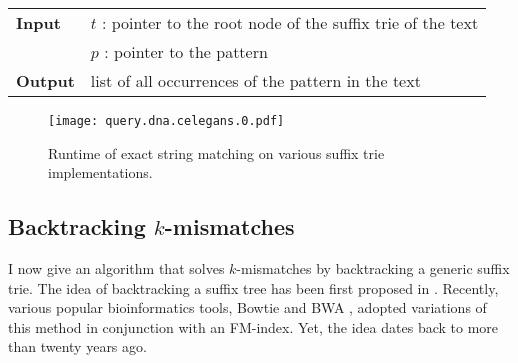 \begin{figure*}[b]
\begin{center}
\begin{minipage}[t]{.8\textwidth}
\begin{algorithm}[H]
\begin{tabular}{ll}
\textbf{Input}  & $t$ : pointer to the root node of the suffix trie of the text\\
				& $p$ : pointer to the pattern\\
\textbf{Output} & list of all occurrences of the pattern in the text\\
\end{tabular}
\begin{algorithmic}[1]
	\State \Report {}
		\State {}
\EndIf
\end{algorithmic}
\label{alg:st-exact}
\end{algorithm}
\end{minipage}
\end{center}
\end{figure*}

\begin{figure}[t]
\begin{center}
\caption[Exact string matching runtime]{Runtime of exact string matching on various suffix trie implementations.}
\label{fig:query-dna-exact}
\texttt{[image: query.dna.celegans.0.pdf]}
\end{center}
\end{figure}

%

\subsection{Backtracking $k$-mismatches}
\label{sec:index:algo:kmismatches}

I now give an algorithm that solves $k$-mismatches by backtracking a generic suffix trie.
The idea of backtracking a suffix tree has been first proposed in \citep{Ukkonen1993}.
Recently, various popular bioinformatics tools, \eg Bowtie \citep{Langmead2009} and BWA \citep{Li2009}, adopted variations of this method in conjunction with an FM-index.
Yet, the idea dates back to more than twenty years ago.

